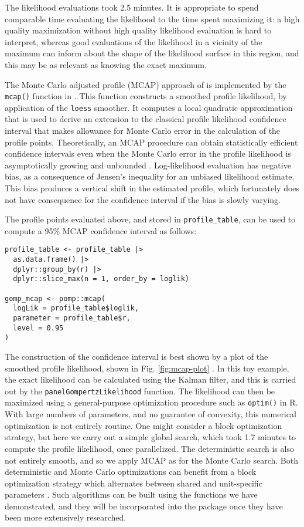 The likelihood evaluations took 2.5 minutes.
It is appropriate to spend comparable time evaluating the likelihood to the time spent maximizing it: a high quality maximization without high quality likelihood evaluation is hard to interpret, whereas good evaluations of the likelihood in a vicinity of the maximum can inform about the shape of the likelihood surface in this region, and this may be as relevant as knowing the exact maximum.

The Monte Carlo adjusted profile (MCAP) approach of \citet{ionides17} is implemented by the \texttt{mcap()} function in .
This function constructs a smoothed profile likelihood, by application of the \texttt{loess} smoother.
It computes a local quadratic approximation that is used to derive an extension to the classical profile likelihood confidence interval that makes allowance for Monte Carlo error in the calculation of the profile points.
Theoretically, an MCAP procedure can obtain statistically efficient confidence intervals even when the Monte Carlo error in the profile likelihood is asymptotically growing and unbounded \citep{ning21}.
Log-likelihood evaluation has negative bias, as a consequence of Jensen's inequality for an unbiased likelihood estimate.
This bias produces a vertical shift in the estimated profile, which fortunately does not have consequence for the confidence interval if the bias is slowly varying.

The profile points evaluated above, and stored in \texttt{profile\_table}, can be used to compute a 95\% MCAP confidence interval as follows:

\begin{verbatim}
profile_table <- profile_table |>
  as.data.frame() |>
  dplyr::group_by(r) |>
  dplyr::slice_max(n = 1, order_by = loglik)

gomp_mcap <- pomp::mcap(
  logLik = profile_table$loglik,
  parameter = profile_table$r,
  level = 0.95
)
\end{verbatim}

\noindent The construction of the confidence interval is best shown by a plot of the smoothed profile likelihood, shown in Fig. \ref{fig:mcap-plot} \citep{wickham16}.
In this toy example, the exact likelihood can be calculated using the Kalman filter, and this is carried out by the \texttt{panelGompertzLikelihood} function.
The likelihood can then be maximized using a general-purpose optimization procedure such as \texttt{optim()} in R.
With large numbers of parameters, and no guarantee of convexity, this numerical optimization is not entirely routine.
One might consider a block optimization strategy, but here we carry out a simple global search, which took 1.7 minutes to compute the profile likelihood, once parallelized.
The deterministic search is also not entirely smooth, and so we apply MCAP as for the Monte Carlo search.
Both deterministic and Monte Carlo optimizations can benefit from a block optimization strategy which alternates between shared and unit-specific parameters \citep{breto20}.
Such algorithms can be built using the  functions we have demonstrated, and they will be incorporated into the package once they have been more extensively researched.


